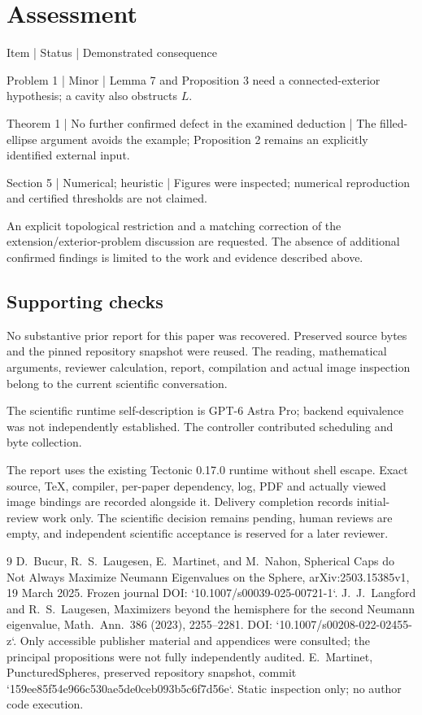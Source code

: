 \documentclass[10pt]{article}
\begin{document}
\section*{Assessment}
Item | Status | Demonstrated consequence\par
Problem 1 | Minor | Lemma 7 and Proposition 3 need a connected-exterior hypothesis; a cavity also obstructs \(L\).\par
Theorem 1 | No further confirmed defect in the examined deduction | The filled-ellipse argument avoids the example; Proposition 2 remains an explicitly identified external input.\par
Section 5 | Numerical; heuristic | Figures were inspected; numerical reproduction and certified thresholds are not claimed.\par
An explicit topological restriction and a matching correction of the extension/exterior-problem discussion are requested. The absence of additional confirmed findings is limited to the work and evidence described above.\par
\subsection*{Supporting checks}
No substantive prior report for this paper was recovered. Preserved source bytes and the pinned repository snapshot were reused. The reading, mathematical arguments, reviewer calculation, report, compilation and actual image inspection belong to the current scientific conversation.\par
The scientific runtime self-description is GPT-6 Astra Pro; backend equivalence was not independently established. The controller contributed scheduling and byte collection.\par
The report uses the existing Tectonic 0.17.0 runtime without shell escape. Exact source, TeX, compiler, per-paper dependency, log, PDF and actually viewed image bindings are recorded alongside it. Delivery completion records initial-review work only. The scientific decision remains pending, human reviews are empty, and independent scientific acceptance is reserved for a later reviewer.\par
9 D. Bucur, R. S. Laugesen, E. Martinet, and M. Nahon, Spherical Caps do Not Always Maximize Neumann Eigenvalues on the Sphere, arXiv:2503.15385v1, 19 March 2025. Frozen journal DOI: `10.1007/s00039-025-00721-1`. J. J. Langford and R. S. Laugesen, Maximizers beyond the hemisphere for the second Neumann eigenvalue, Math. Ann. 386 (2023), 2255–2281. DOI: `10.1007/s00208-022-02455-z`. Only accessible publisher material and appendices were consulted; the principal propositions were not fully independently audited. E. Martinet, PuncturedSpheres, preserved repository snapshot, commit `159ee85f54e966c530ae5de0ceb093b5c6f7d56e`. Static inspection only; no author code execution.\par
\end{document}
